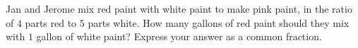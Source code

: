 Jan and Jerome mix red paint with white paint to make pink paint, in the ratio of $4$ parts red to $5$ parts white. How many gallons of red paint should they mix with $1$ gallon of white paint? Express your answer as a common fraction.

